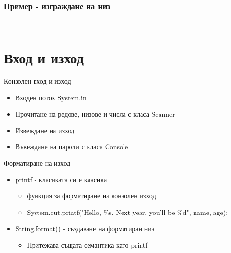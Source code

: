 \documentclass{beamer}
\begin{document}
\begin{frame}[fragile]
  \frametitle{Пример - изграждане на низ}
  \transdissolve
\begin{lstlisting}
  
\end{lstlisting}
\end{frame}

\section{Вход и изход}
\begin{frame}{Конзолен вход и изход}
  \transdissolve
  \begin{itemize}
  \item Входен поток System.in
  \item Прочитане на редове, низове и числа с класа Scanner
  \item Извеждане на изход
  \item Въвеждане на пароли с класа Console
  \end{itemize}
\end{frame}

\begin{frame}{Форматиране на изход}
  \transdissolve
  \begin{itemize}
  \item printf - класиката си е класика
    \begin{itemize}
      \item функция за форматиране на конзолен изход
      \item System.out.printf("Hello, \%s. Next year, you'll be \%d", name, age);
    \end{itemize}
  \item String.format() - създаване на форматиран низ
    \begin{itemize}
      \item Притежава същата семантика като printf
    \end{itemize}

  \end{itemize}
\end{frame}
\end{document}
